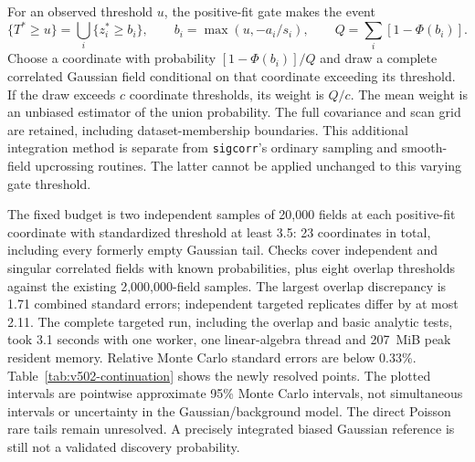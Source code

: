 For an observed threshold $u$, the positive-fit gate makes the event
\begin{equation}
 \{T^*\geq u\}=\bigcup_i\{z_i^*\geq b_i\},\qquad
 b_i=\max(u,-a_i/s_i),\qquad Q=\sum_i[1-\Phi(b_i)].
 \label{eq:v502-tail-union}
\end{equation}
Choose a coordinate with probability $[1-\Phi(b_i)]/Q$ and draw a complete
correlated Gaussian field conditional on that coordinate exceeding its
threshold. If the draw exceeds $c$ coordinate thresholds, its weight is
$Q/c$. The mean weight is an unbiased estimator of the union probability.
The full covariance and scan grid are retained, including dataset-membership
boundaries. This additional integration method is separate from
\texttt{sigcorr}'s ordinary sampling and smooth-field upcrossing routines.
The latter cannot be applied unchanged to this varying gate threshold.

The fixed budget is two independent samples of 20,000 fields at each
positive-fit coordinate with standardized threshold at least 3.5:
23 coordinates in total, including every formerly empty Gaussian tail.
Checks cover independent and singular correlated fields with known
probabilities, plus eight overlap thresholds against the existing
2,000,000-field samples. The largest overlap discrepancy is 1.71 combined
standard errors; independent targeted replicates differ by at most 2.11.
The complete targeted run, including the overlap and basic analytic tests,
took 3.1 seconds with one worker, one linear-algebra thread and 207~MiB
peak resident memory. Relative Monte Carlo standard errors are below
0.33\%. Table~\ref{tab:v502-continuation} shows the newly resolved points.
The plotted intervals are pointwise approximate 95\% Monte Carlo intervals,
not simultaneous intervals or uncertainty in the Gaussian/background model.
The direct Poisson rare tails remain unresolved. A precisely integrated
biased Gaussian reference is still not a validated discovery probability.

\begin{table}[htbp]\centering\small

\caption{Previously zero-count Gaussian tails resolved by conditional-mixture
sampling of the unchanged finite-grid stress model. Each estimate uses
40,000 weighted fields. The last column gives the relative Monte Carlo
standard error. The $Z$ column is a normal-quantile representation of the
conditional probability, not a particle significance. Ordinary Gaussian
sampling gives 0/2,000,000 at every listed point; the independent direct
Poisson study remains limited to 1,000 experiments.}
\label{tab:v502-continuation}
\end{table}

